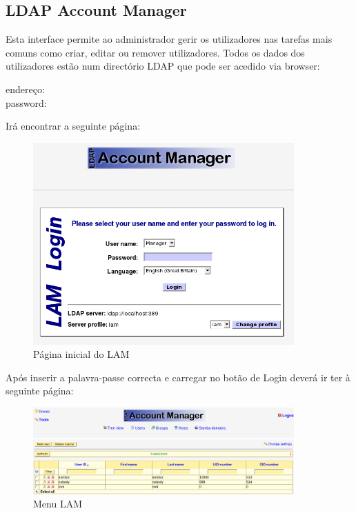 \subsection{LDAP Account Manager}

Esta interface permite ao administrador gerir os utilizadores nas tarefas mais comuns como criar, editar ou remover utilizadores.
Todos os dados dos utilizadores estão num directório LDAP que pode ser acedido via browser:
\begin{description}
	\item[endereço:] \lamurl
	\item[password:] \lampassword
\end{description}

Irá encontrar a seguinte página:

\begin{figure}[H]
    \begin{center}
        \includegraphics[width=10cm]{include/img/lam1}
    \end{center}
    \caption{Página inicial do LAM}
    \label{fig:LAM1}
\end{figure}


Após inserir a palavra-passe correcta e carregar no botão de Login deverá ir ter à seguinte página:

\begin{figure}[H]
    \begin{center}
        \includegraphics[width=10cm]{include/img/lam2}
    \end{center}
    \caption{Menu LAM}
    \label{fig:LAM2}
\end{figure}

